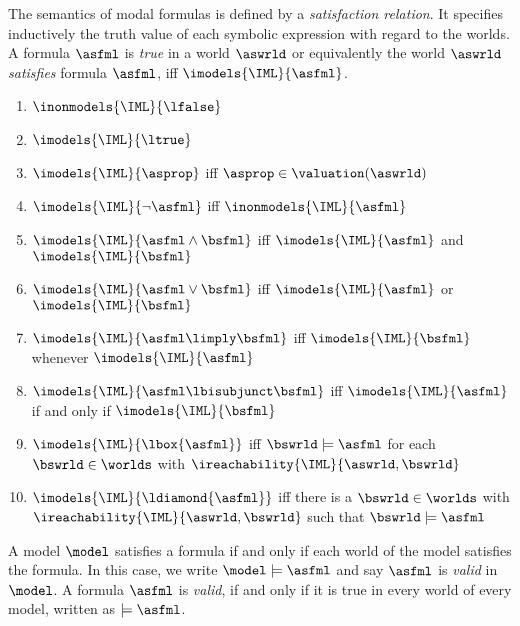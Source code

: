             \begin{definition}
                The semantics of modal formulas is defined by a \emph{satisfaction relation}.
                It specifies inductively the truth value of each symbolic expression with regard to the worlds. A formula $\asfml$ is \emph{true} in a world $\aswrld$ or equivalently the world $\aswrld$ \emph{satisfies} formula $\asfml$, iff $\imodels{\IML}{\asfml}$.
                \begin{enumerate}
                    \item $\inonmodels{\IML}{\lfalse}$
                    \item $\imodels{\IML}{\ltrue}$
                    \item $\imodels{\IML}{\asprop}$ iff $\asprop\in \valuation(\aswrld)$
                    \item $\imodels{\IML}{\lnot\asfml}$ iff $\inonmodels{\IML}{\asfml}$
                    \item $\imodels{\IML}{\asfml\land\bsfml}$ iff $\imodels{\IML}{\asfml}$ and $\imodels{\IML}{\bsfml}$
                    \item $\imodels{\IML}{\asfml\lor\bsfml}$ iff $\imodels{\IML}{\asfml}$ or $\imodels{\IML}{\bsfml}$
                    \item $\imodels{\IML}{\asfml\limply\bsfml}$ iff $\imodels{\IML}{\bsfml}$ whenever $\imodels{\IML}{\asfml}$
                    \item $\imodels{\IML}{\asfml\lbisubjunct\bsfml}$ iff $\imodels{\IML}{\asfml}$ if and only if $\imodels{\IML}{\bsfml}$
                    \item $\imodels{\IML}{\lbox{\asfml}}$ iff $\bswrld\models\asfml$ for each $\bswrld\in\worlds$ with $\ireachability{\IML}{\aswrld,\bswrld}$
                    \item $\imodels{\IML}{\ldiamond{\asfml}}$ iff there is a $\bswrld\in\worlds$ with $\ireachability{\IML}{\aswrld,\bswrld}$ such that $\bswrld\models\asfml$
                \end{enumerate}
                A model $\model$ satisfies a formula if and only if each world of the model satisfies the formula. In this case, we write $\model\models\asfml$ and say $\asfml$ is \emph{valid} in $\model$.
                A formula $\asfml$ is \emph{valid}, if and only if it is true in every world of every model, written as $\models\asfml$.
            \end{definition}

